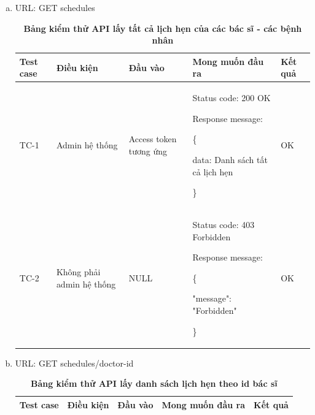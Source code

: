 \begin{enumerate}[a)]
	\item URL: GET schedules
	      \begin{xltabular}{\textwidth}{
		      | >{\raggedright\arraybackslash}p{1cm}
		      | >{\raggedright\arraybackslash}p{2.5cm}
		      | >{\raggedright\arraybackslash}p{2.5cm}
		      | >{\raggedright\arraybackslash}X
		      | >{\raggedright\arraybackslash}p{1cm}|
		      }
		      \caption{\bfseries \fontsize{12pt}{0pt}\selectfont Bảng kiểm thử API lấy tất cả lịch hẹn của các bác sĩ - các bệnh nhân}
		      \\
		      \hline
		      \bfseries Test case    &\bfseries Điều kiện   &\bfseries Đầu vào
		      &\bfseries Mong muốn đầu ra &\bfseries Kết quả\\ \hline


		      TC-1
		      & Admin hệ thống
		      & Access token tương ứng
		      &

		      Status code: 200 OK

		      Response message:

		      \{

		      data: Danh sách tất cả lịch hẹn

		      \}
		      & OK

		      \\ \hline

		      TC-2
		      & Không phải admin hệ thống
		      & NULL

		      &

		      Status code: 403 Forbidden

		      Response message:

		      \{

		      "message": "Forbidden"

		      \}
		      & OK
		      \\ \hline
	      \end{xltabular}

	\item URL: GET schedules/doctor-id
	      \begin{xltabular}{\textwidth}{
		      | >{\raggedright\arraybackslash}p{1cm}
		      | >{\raggedright\arraybackslash}p{2.5cm}
		      | >{\raggedright\arraybackslash}X
		      | >{\raggedright\arraybackslash}X
		      | >{\raggedright\arraybackslash}p{1cm}|
		      }
		      \caption{\bfseries \fontsize{12pt}{0pt}\selectfont Bảng kiểm thử API lấy danh sách lịch hẹn theo id bác sĩ}
		      \\
		      \hline
		      \bfseries Test case    &\bfseries Điều kiện   &\bfseries Đầu vào
		      &\bfseries Mong muốn đầu ra &\bfseries Kết quả\\ \hline



\end{xltabular}
\end{enumerate}
